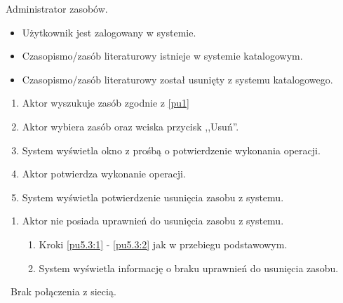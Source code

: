 Administrator zasobów.

\begin{itemize}
\item Użytkownik jest zalogowany w systemie.
\item Czasopismo/zasób literaturowy istnieje w systemie katalogowym.
\end{itemize}

\begin{itemize}
\item Czasopismo/zasób literaturowy został usunięty z systemu katalogowego.
\end{itemize}

\begin{enumerate}
\item \label{pu5.3:1} Aktor wyszukuje zasób zgodnie z \ref{pu1}
\item \label{pu5.3:2} Aktor wybiera zasób oraz wciska przycisk ,,Usuń''.
\item System wyświetla okno z prośbą o potwierdzenie wykonania operacji.
\item Aktor potwierdza wykonanie operacji.
\item System wyświetla potwierdzenie usunięcia zasobu z systemu.
\end{enumerate}

\begin{enumerate}
\item Aktor nie posiada uprawnień do usunięcia zasobu z systemu.
	\begin{enumerate}[label*=\arabic*.]
		\item Kroki \ref{pu5.3:1} - \ref{pu5.3:2} jak w przebiegu podstawowym.
		\item System wyświetla informację o braku uprawnień do usunięcia zasobu.
	\end{enumerate}
\end{enumerate}

\
Brak połączenia z siecią.


